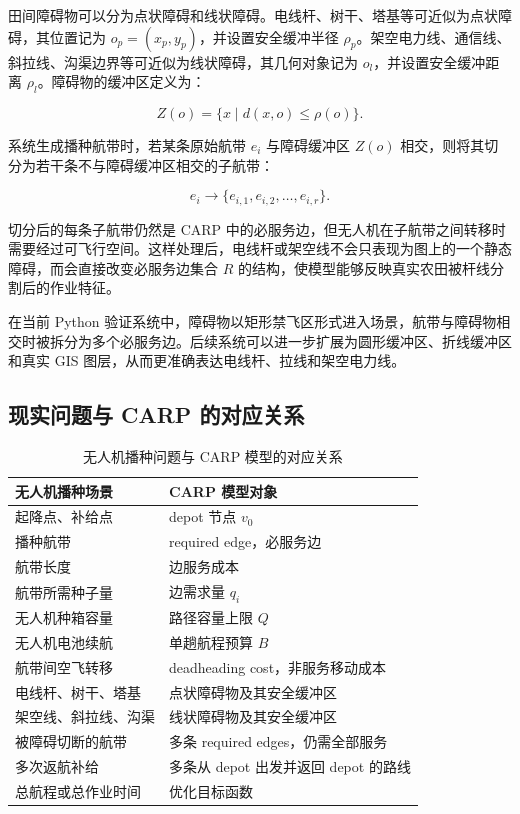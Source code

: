 \documentclass[UTF8,a4paper,12pt]{ctexart}
\begin{document}
田间障碍物可以分为点状障碍和线状障碍。电线杆、树干、塔基等可近似为点状障碍，其位置记为 \(o_p=(x_p,y_p)\)，并设置安全缓冲半径 \(\rho_p\)。架空电力线、通信线、斜拉线、沟渠边界等可近似为线状障碍，其几何对象记为 \(o_l\)，并设置安全缓冲距离 \(\rho_l\)。障碍物的缓冲区定义为：

\[
Z(o)=\{x\mid d(x,o)\leq \rho(o)\}.
\]

系统生成播种航带时，若某条原始航带 \(e_i\) 与障碍缓冲区 \(Z(o)\) 相交，则将其切分为若干条不与障碍缓冲区相交的子航带：

\[
e_i \rightarrow \{e_{i,1}, e_{i,2},\dots,e_{i,r}\}.
\]

切分后的每条子航带仍然是 CARP 中的必服务边，但无人机在子航带之间转移时需要经过可飞行空间。这样处理后，电线杆或架空线不会只表现为图上的一个静态障碍，而会直接改变必服务边集合 \(R\) 的结构，使模型能够反映真实农田被杆线分割后的作业特征。

在当前 Python 验证系统中，障碍物以矩形禁飞区形式进入场景，航带与障碍物相交时被拆分为多个必服务边。后续系统可以进一步扩展为圆形缓冲区、折线缓冲区和真实 GIS 图层，从而更准确表达电线杆、拉线和架空电力线。

\subsection{现实问题与 CARP 的对应关系}

\begin{table}[H]
\centering
\caption{无人机播种问题与 CARP 模型的对应关系}
\begin{tabular}{p{5cm}p{7cm}}
\toprule
无人机播种场景 & CARP 模型对象 \\
\midrule
起降点、补给点 & depot 节点 \(v_0\) \\
播种航带 & required edge，必服务边 \\
航带长度 & 边服务成本 \\
航带所需种子量 & 边需求量 \(q_i\) \\
无人机种箱容量 & 路径容量上限 \(Q\) \\
无人机电池续航 & 单趟航程预算 \(B\) \\
航带间空飞转移 & deadheading cost，非服务移动成本 \\
电线杆、树干、塔基 & 点状障碍物及其安全缓冲区 \\
架空线、斜拉线、沟渠 & 线状障碍物及其安全缓冲区 \\
被障碍切断的航带 & 多条 required edges，仍需全部服务 \\
多次返航补给 & 多条从 depot 出发并返回 depot 的路线 \\
总航程或总作业时间 & 优化目标函数 \\
\bottomrule
\end{tabular}
\end{table}
\end{document}
